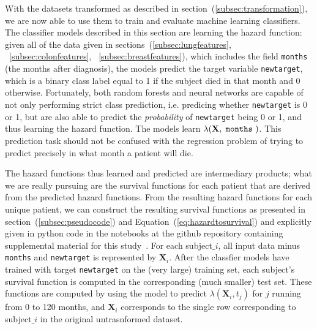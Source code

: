 \documentclass[a4paper,11pt]{article}
\newcommand{\codewhite}[1]{\colorbox{white}{\texttt{#1}}}
\begin{document}
With the datasets transformed as described in section~(\ref{subsec:transformation}), we are now able to use them to train and evaluate machine learning classifiers.
The classifier models described in this section are learning the hazard function: given all of the data given in sections~(\ref{subsec:lungfeatures}, ~\ref{subsec:colonfeatures}, ~\ref{subsec:breastfeatures}), which includes the field \codewhite{months} (the months after diagnosis), the models predict the target variable \codewhite{newtarget}, which is a binary class label equal to 1 if the subject died in that month and 0 otherwise.
Fortunately, both random forests and neural networks are capable of not only performing strict class prediction, i.e. predicing whether \codewhite{newtarget} is 0 or 1, but are also able to predict the \emph{probability} of \codewhite{newtarget} being 0 or 1, and thus learning the hazard function.
The models learn $\lambda(\mathbf{X}, \codewhite{months})$.
This prediction task should not be confused with the regression problem of trying to predict precisely in what month a patient will die.


The hazard functions thus learned and predicted are intermediary products; what we are really pursuing are the survival functions for each patient that are derived from the predicted hazard functions.
From the resulting hazard functions for each unique patient, we can construct the
resulting survival functions as presented in section~(\ref{subsec:pseudocode}) and Equation~(\ref{eq:hazardtosurvival}) and explicitly given in python code in the notebooks at the github repository containing supplemental material for this study~\cite{supp}.
For each subject$\_i$, all input data minus \codewhite{months} and \codewhite{newtarget} is represented by $\mathbf{X}_{i}$. After the classfier models have trained with target \codewhite{newtarget} on the (very large) training set, each subject's survival function is computed in the corresponding (much smaller) test set.
These functions are computed by using the model to predict $\lambda(\mathbf{X}_i, t_{j})$ for $j$ running from 0 to 120 months, and $\mathbf{X}_{i}$ corresponds to the single row corresponding to subject$\_i$ in the original untrasnformed dataset.
\end{document}
